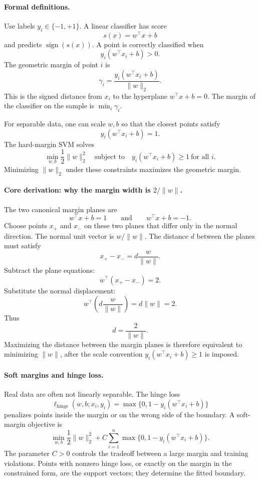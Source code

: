 \paragraph{Formal definitions.}
Use labels \(y_i\in\{-1,+1\}\). A linear classifier has score
\[
s(x)=w^\top x+b
\]
and predicts \(\operatorname{sign}(s(x))\). A point is correctly classified when
\[
y_i(w^\top x_i+b)>0.
\]
The geometric margin of point \(i\) is
\[
\gamma_i=\frac{y_i(w^\top x_i+b)}{\|w\|_2}.
\]
This is the signed distance from \(x_i\) to the hyperplane \(w^\top x+b=0\). The margin of the classifier on the sample is \(\min_i\gamma_i\).

For separable data, one can scale \(w,b\) so that the closest points satisfy
\[
y_i(w^\top x_i+b)=1.
\]
The hard-margin SVM solves
\[
\boxed{
\min_{w,b}\frac12\|w\|_2^2
\quad\text{subject to}\quad
y_i(w^\top x_i+b)\geq1\ \text{for all }i.
}
\]
Minimizing \(\|w\|_2\) under these constraints maximizes the geometric margin.

\paragraph{Core derivation: why the margin width is \(2/\|w\|\).}
The two canonical margin planes are
\[
w^\top x+b=1
\qquad\text{and}\qquad
w^\top x+b=-1.
\]
Choose points \(x_+\) and \(x_-\) on these two planes that differ only in the normal direction. The normal unit vector is \(w/\|w\|\). The distance \(d\) between the planes must satisfy
\[
x_+-x_-=d\frac{w}{\|w\|}.
\]
Subtract the plane equations:
\[
w^\top(x_+-x_-)=2.
\]
Substitute the normal displacement:
\[
w^\top\left(d\frac{w}{\|w\|}\right)=d\|w\|=2.
\]
Thus
\[
\boxed{d=\frac{2}{\|w\|}.}
\]
Maximizing the distance between the margin planes is therefore equivalent to minimizing \(\|w\|\), after the scale convention \(y_i(w^\top x_i+b)\geq1\) is imposed.

\paragraph{Soft margins and hinge loss.}
Real data are often not linearly separable. The hinge loss
\[
\ell_{\mathrm{hinge}}(w,b;x_i,y_i)
=\max\{0,1-y_i(w^\top x_i+b)\}
\]
penalizes points inside the margin or on the wrong side of the boundary. A soft-margin objective is
\[
\boxed{
\min_{w,b}
\frac12\|w\|_2^2
+C\sum_{i=1}^n
\max\{0,1-y_i(w^\top x_i+b)\}.
}
\]
The parameter \(C>0\) controls the tradeoff between a large margin and training violations. Points with nonzero hinge loss, or exactly on the margin in the constrained form, are the support vectors; they determine the fitted boundary.

